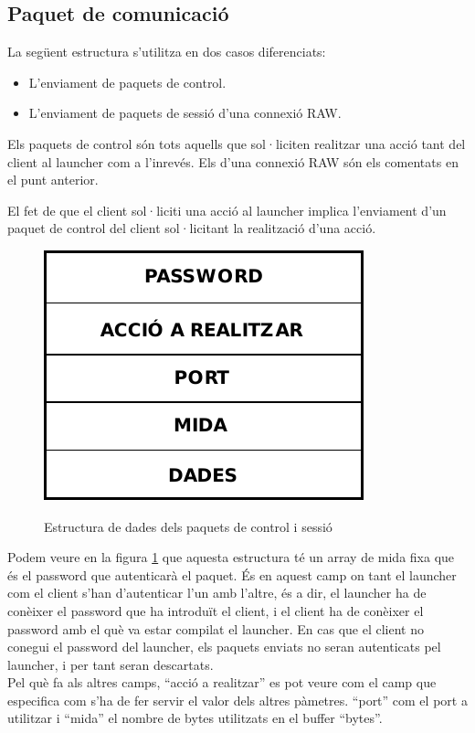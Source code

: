 \subsection{Paquet de comunicació} \label{sec:paquet}

La següent estructura s'utilitza en dos casos diferenciats:
\begin{itemize}
    \item L'enviament de paquets de control.
    \item L'enviament de paquets de sessió d'una connexió RAW.
\end{itemize}

Els paquets de control són tots aquells que sol·liciten realitzar una acció tant del client al launcher com a l'inrevés.
Els d'una connexió RAW són els comentats en el punt anterior.

El fet de que el client sol·liciti una acció al launcher implica l'enviament d'un paquet de control del client sol·licitant
la realització d'una acció. 

\begin{figure}[htp]
    \centering
    \includegraphics[scale=1,keepaspectratio]{diagrames/packet.pdf} \\
    \caption{Estructura de dades dels paquets de control i sessió}
    \label{fig:packetScheme}
\end{figure}

Podem veure en la figura \ref{fig:packetScheme} que aquesta estructura té un array de mida fixa que és el password que autenticarà el paquet. És en aquest camp on tant el launcher
com el client s'han d'autenticar l'un amb l'altre, és a dir, el launcher ha de conèixer el password que ha introduït 
el client, i el client ha de conèixer el password amb el què va estar compilat el launcher. En cas que 
el client no conegui el password del launcher, els paquets enviats no seran autenticats pel launcher, i per tant 
seran descartats.\\

Pel què fa als altres camps, ``acció a realitzar'' es pot 
veure com el camp que especifica com s'ha de fer servir el valor dels altres pàmetres. ``port'' com el port a 
utilitzar i ``mida'' el nombre de bytes utilitzats en el buffer ``bytes''.


